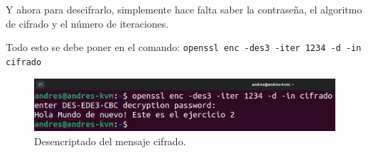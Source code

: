 \documentclass{article}
\begin{document}
Y ahora para descifrarlo, simplemente hace falta saber la contraseña, el algoritmo de cifrado y el número de iteraciones. 

\bigskip

Todo esto se debe poner en el comando: \verb|openssl enc -des3 -iter 1234 -d -in cifrado|

\begin{figure}[H]
    \includegraphics[width=\textwidth]{imagenes/Captura desde 2022-10-19 17-54-02.png}
    \caption{Desencriptado del mensaje cifrado.}
\end{figure}
\end{document}
